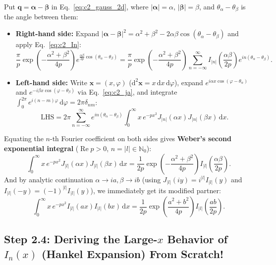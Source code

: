 \documentclass[10pt,letterpaper]{article}
\newcommand{\abs}[1]{\lvert #1 \rvert}
\newcommand{\dd}{\mathrm{d}}
\numberwithin{equation}{section}
\begin{document}
Put $\mathbf{q} = \boldsymbol{\alpha} - \boldsymbol{\beta}$ in Eq.~\eqref{eq:c2_gauss_2d}, where $\abs{\boldsymbol{\alpha}} = \alpha$, $\abs{\boldsymbol{\beta}} = \beta$, and $\theta_\alpha - \theta_\beta$ is the angle between them:
\begin{itemize}[leftmargin=1.4em,itemsep=1pt,topsep=1pt]
  \item \textbf{Right-hand side:} Expand $\abs{\boldsymbol{\alpha}-\boldsymbol{\beta}}^2 = \alpha^2 + \beta^2 - 2\alpha\beta\cos(\theta_\alpha - \theta_\beta)$ and apply Eq.~\eqref{eq:c2_In}:
  \[
    \frac{\pi}{p}\exp\!\left(-\frac{\alpha^2+\beta^2}{4p}\right) e^{\frac{\alpha\beta}{2p}\cos(\theta_\alpha-\theta_\beta)}
    = \frac{\pi}{p}\exp\!\left(-\frac{\alpha^2+\beta^2}{4p}\right)\sum_{n=-\infty}^\infty I_{\abs{n}}\!\left(\frac{\alpha\beta}{2p}\right) e^{in(\theta_\alpha-\theta_\beta)}.
  \]
  \item \textbf{Left-hand side:} Write $\mathbf{x} = (x,\varphi)$ ($\dd^2\mathbf{x} = x\,\dd x\,\dd\varphi$), expand $e^{i\alpha x\cos(\varphi-\theta_\alpha)}$ and $e^{-i\beta x\cos(\varphi-\theta_\beta)}$ via Eq.~\eqref{eq:c2_ja}, and integrate $\int_0^{2\pi} e^{i(n-m)\varphi}\,\dd\varphi = 2\pi\delta_{nm}$:
  \[
    \text{LHS} = 2\pi\sum_{n=-\infty}^\infty e^{in(\theta_\alpha-\theta_\beta)}\int_0^\infty x\,e^{-px^2} J_{\abs{n}}(\alpha x) J_{\abs{n}}(\beta x)\,\dd x.
  \]
\end{itemize}
Equating the $n$-th Fourier coefficient on both sides gives \textbf{Weber's second exponential integral} ($\operatorname{Re} p > 0$, $n = \abs{l} \in \mathbb{N}_0$):
\begin{equation}
  \int_0^\infty x\,e^{-px^2} J_{\abs{l}}(\alpha x) J_{\abs{l}}(\beta x)\,\dd x = \frac{1}{2p}\exp\!\left(-\frac{\alpha^2+\beta^2}{4p}\right) I_{\abs{l}}\!\left(\frac{\alpha\beta}{2p}\right).
  \label{eq:c2_weberJ}
\end{equation}
And by analytic continuation $\alpha \to ia, \beta \to ib$ (using $J_{\abs{l}}(iy) = i^{\abs{l}}I_{\abs{l}}(y)$ and $I_{\abs{l}}(-y) = (-1)^{\abs{l}}I_{\abs{l}}(y)$), we immediately get its modified partner:
\begin{equation}
  \int_0^\infty x\,e^{-px^2} I_{\abs{l}}(ax) I_{\abs{l}}(bx)\,\dd x = \frac{1}{2p}\exp\!\left(\frac{a^2+b^2}{4p}\right) I_{\abs{l}}\!\left(\frac{ab}{2p}\right).
  \label{eq:c2_weberI}
\end{equation}

\subsection{Step 2.4: Deriving the Large-$x$ Behavior of $I_n(x)$ (Hankel Expansion) From Scratch!}
\end{document}
